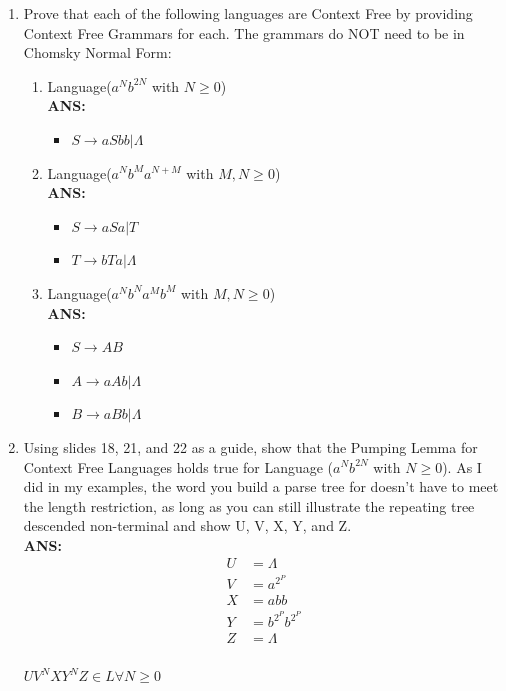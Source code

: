 \documentclass[letterpaper, 12 pt]{article}
\begin{document}
\begin{enumerate}
    \item[22.] Prove that each of the following languages are Context Free by
        providing Context Free Grammars for each. The grammars do NOT need to be
        in Chomsky Normal Form:
        \begin{enumerate}
            \item[15.1] Language($a^Nb^{2N}$ with $N\geq 0$) \\
                \textbf{ANS:} 
                \begin{itemize}
                    \item $S \to aSbb | \Lambda$
                \end{itemize}
            \item[15.2] Language($a^Nb^Ma^{N+M}$ with $M,N\geq 0$) \\
                \textbf{ANS:} 
                \begin{itemize}
                    \item $S \to aSa | T$
                    \item $T \to bTa | \Lambda$
                \end{itemize}
            \item[15.3] Language($a^Nb^Na^Mb^M$ with $M,N\geq 0$) \\
                \textbf{ANS:} 
                \begin{itemize}
                    \item $S \to AB$
                    \item $A \to aAb | \Lambda$
                    \item $B \to aBb | \Lambda$
                \end{itemize}
        \end{enumerate}

    \item[23.] Using slides 18, 21, and 22 as a guide, show that the Pumping
        Lemma for Context Free Languages holds true for Language ($a^Nb^{2N}$
        with $N\geq 0$). As I did in my examples, the word you build a parse
        tree for doesn’t have to meet the length restriction, as long as you can
        still illustrate the repeating tree descended non-terminal and show U,
        V, X, Y, and Z. \\
        \textbf{ANS:}
        \begin{align*}
            U &= \Lambda \\
            V &= a^{2^P} \\
            X &= abb \\
            Y &= b^{2^P}b^{2^P} \\
            Z &= \Lambda \\
        \end{align*}

        $UV^NXY^NZ \in L \forall N \geq 0$
\end{enumerate}
\end{document}
